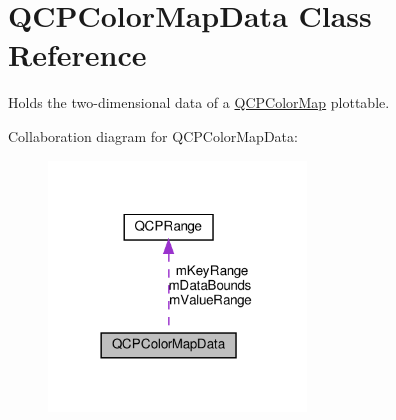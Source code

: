 \hypertarget{classQCPColorMapData}{}\section{Q\+C\+P\+Color\+Map\+Data Class Reference}
\label{classQCPColorMapData}


Holds the two-\/dimensional data of a \hyperlink{classQCPColorMap}{Q\+C\+P\+Color\+Map} plottable.  




Collaboration diagram for Q\+C\+P\+Color\+Map\+Data\+:\nopagebreak
\begin{figure}[H]
\begin{center}
\leavevmode
\includegraphics[width=194pt]{classQCPColorMapData__coll__graph}
\end{center}
\end{figure}
